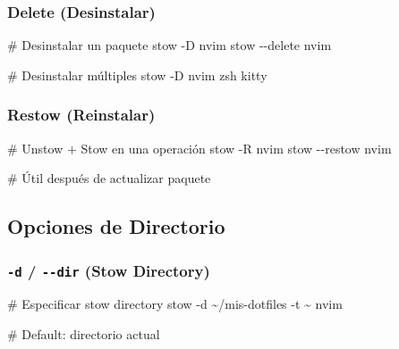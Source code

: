 \documentclass[
  doc,
  floatsintext,
  longtable,
  a4paper,
  nolmodern,
  notxfonts,
  notimes,
  12pt,
  colorlinks=true,linkcolor=blue,citecolor=blue,urlcolor=blue]{apa7}
\newenvironment{Shaded}{\begin{snugshade}}{\end{snugshade}}
\newcommand{\AttributeTok}[1]{\textcolor[rgb]{0.40,0.45,0.13}{#1}}
\newcommand{\CommentTok}[1]{\textcolor[rgb]{0.37,0.37,0.37}{#1}}
\newcommand{\ExtensionTok}[1]{\textcolor[rgb]{0.00,0.23,0.31}{#1}}
\newcommand{\NormalTok}[1]{\textcolor[rgb]{0.00,0.23,0.31}{#1}}
\begin{document}
\subsubsection{Delete (Desinstalar)}\label{delete-desinstalar}

\begin{Shaded}
\begin{Highlighting}[]
\CommentTok{\# Desinstalar un paquete}
\ExtensionTok{stow} \AttributeTok{{-}D}\NormalTok{ nvim}
\ExtensionTok{stow} \AttributeTok{{-}{-}delete}\NormalTok{ nvim}

\CommentTok{\# Desinstalar múltiples}
\ExtensionTok{stow} \AttributeTok{{-}D}\NormalTok{ nvim zsh kitty}
\end{Highlighting}
\end{Shaded}

\subsubsection{Restow (Reinstalar)}\label{restow-reinstalar}

\begin{Shaded}
\begin{Highlighting}[]
\CommentTok{\# Unstow + Stow en una operación}
\ExtensionTok{stow} \AttributeTok{{-}R}\NormalTok{ nvim}
\ExtensionTok{stow} \AttributeTok{{-}{-}restow}\NormalTok{ nvim}

\CommentTok{\# Útil después de actualizar paquete}
\end{Highlighting}
\end{Shaded}

\subsection{Opciones de Directorio}\label{opciones-de-directorio}

\subsubsection{\texorpdfstring{\texttt{-d} / \texttt{-\/-dir} (Stow
Directory)}{-d / -\/-dir (Stow Directory)}}\label{d---dir-stow-directory}

\begin{Shaded}
\begin{Highlighting}[]
\CommentTok{\# Especificar stow directory}
\ExtensionTok{stow} \AttributeTok{{-}d}\NormalTok{ \textasciitilde{}/mis{-}dotfiles }\AttributeTok{{-}t}\NormalTok{ \textasciitilde{} nvim}

\CommentTok{\# Default: directorio actual}
\end{Highlighting}
\end{Shaded}
\end{document}
